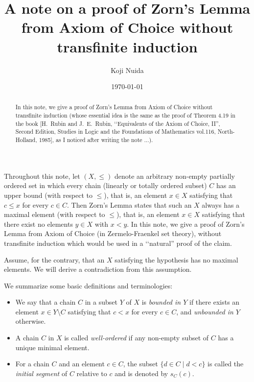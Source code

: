 \documentclass{article}
\title{A note on a proof of Zorn's Lemma from Axiom of Choice without transfinite induction}
\author{Koji Nuida}
\date{\today}
\begin{document}
\maketitle

\begin{abstract}
In this note, we give a proof of Zorn's Lemma from Axiom of Choice without transfinite induction (whose essential idea is the same as the proof of Theorem 4.19 in the book [H.~Rubin and J.~E.~Rubin, \lq\lq Equivalents of the Axiom of Choice, II'', Second Edition, Studies in Logic and the Foundations of Mathematics vol.116, North-Holland, 1985], as I noticed after writing the note ...).
\end{abstract}

Throughout this note, let $(X,\leq)$ denote an arbitrary non-empty partially ordered set in which every chain (linearly or totally ordered subset) $C$ has an upper bound (with respect to $\leq$), that is, an element $x \in X$ satisfying that $c \leq x$ for every $c \in C$.
Then Zorn's Lemma states that such an $X$ always has a maximal element (with respect to $\leq$), that is, an element $x \in X$ satisfying that there exist no elements $y \in X$ with $x < y$.
In this note, we give a proof of Zorn's Lemma from Axiom of Choice (in Zermelo-Fraenkel set theory), without transfinite induction which would be used in a \lq\lq natural'' proof of the claim.

Assume, for the contrary, that an $X$ satisfying the hypothesis has no maximal elements.
We will derive a contradiction from this assumption.

We summarize some basic definitions and terminologies:
\begin{itemize}
\item We say that a chain $C$ in a subset $Y$ of $X$ is \emph{bounded in $Y$} if there exists an element $x \in Y \setminus C$ satisfying that $c < x$ for every $c \in C$, and \emph{unbounded in $Y$} otherwise.
\item A chain $C$ in $X$ is called \emph{well-ordered} if any non-empty subset of $C$ has a unique minimal element.
\item For a chain $C$ and an element $c \in C$, the subset $\{d \in C \mid d < c\}$ is called the \emph{initial segment} of $C$ relative to $c$ and is denoted by $s_C(c)$.
\end{itemize}
\end{document}
